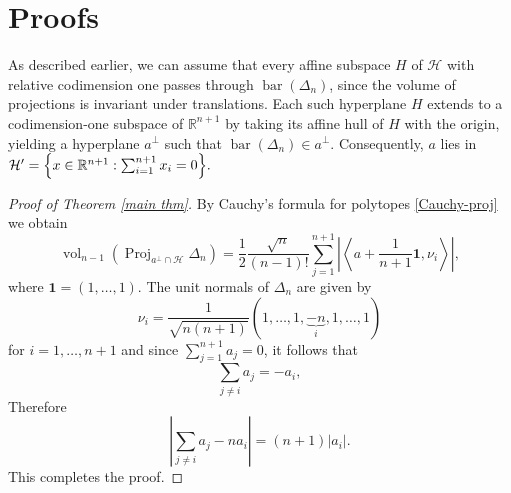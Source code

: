 \documentclass[10pt]{amsart}
\newcommand{\1}{\textbf{1}}
\numberwithin{equation}{section} %
\theoremstyle{remark}
\theoremstyle{definition}
\begin{document}
\section{Proofs}

As described earlier, we can assume that every affine subspace $H$ of $\mathcal{H}$ with relative codimension one passes through $\operatorname{bar}(\Delta_n)$, since the volume of projections is invariant under translations.  
Each such hyperplane $H$ extends to a codimension-one subspace of $\mathbb{R}^{n+1}$ by taking its affine hull of $H$ with the origin, yielding a hyperplane $a^\perp$ such that $\operatorname{bar}(\Delta_n)\in a^\perp$.  
Consequently, $a$ lies in $\mathcal{H}' = \Bigl\{ x \in \mathbb{R}^{n+1} : \sum_{i=1}^{n+1} x_i = 0 \Bigr\}.$ 


\begin{proof}[Proof of Theorem \ref{main thm}]
By  Cauchy's formula for polytopes \eqref{Cauchy-proj} we obtain
\begin{equation}\label{ncent_proj}
\operatorname{vol}_{n-1}\left(\operatorname{Proj}_{a^{\perp}\cap \mathcal{H}}\Delta_n \right)=\frac{1}{2}\frac{\sqrt{n}}{(n-1)!}\sum_{j=1}^{n+1} \left| \left\langle a+\frac{1}{n+1}\boldsymbol{1},\nu_i \right\rangle \right|,
\end{equation}
where $\boldsymbol{1}=(1,\ldots,1)$.
The unit normals  of  $\Delta_n$  are given by  $$\nu_i=\frac{1}{\sqrt{n(n+1)}}\left(1,\ldots,1,\underbrace{-n}_{i},1,\ldots,1\right)$$ for $i=1,\ldots,n+1$ and  since $\sum_{j=1}^{n+1} a_j = 0$, it follows that
\[
\sum_{j \neq i} a_j = -a_i,
\]
Therefore
\[
\left| \sum_{j \neq i} a_j - n a_i \right| = (n+1)|a_i|.
\]
This completes the proof.
\end{proof}
\end{document}
